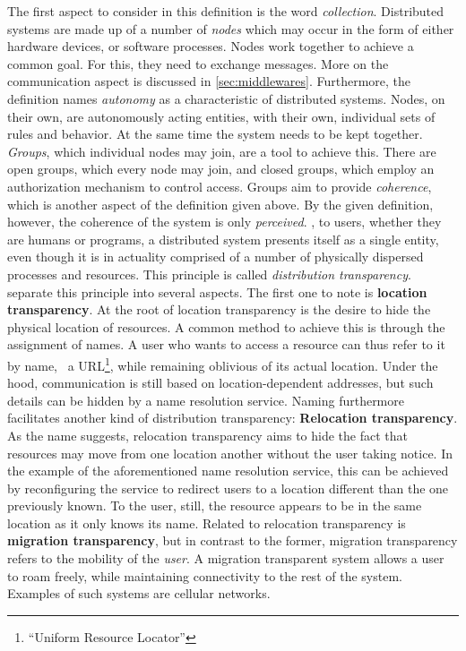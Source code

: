 The first aspect to consider in this definition is the word \emph{collection}. Distributed systems are made up of a number of \emph{nodes} which may occur in the form of either hardware devices, or software processes. Nodes work together to achieve a common goal. For this, they need to exchange messages. More on the communication aspect is discussed in \autoref{sec:middlewares}. Furthermore, the definition names \emph{autonomy} as a characteristic of distributed systems. Nodes, on their own, are autonomously acting entities, with their own, individual sets of rules and behavior. At the same time the system needs to be kept together. \emph{Groups}, which individual nodes may join, are a tool to achieve this. There are open groups, which every node may join, and closed groups, which employ an authorization mechanism to control access. 
Groups aim to provide \emph{coherence}, which is another aspect of the definition given above. By the given definition, however, the coherence of the system is only \emph{perceived}. \Ie , to users, whether they are humans or programs, a distributed system presents itself as a single entity, even though it is in actuality comprised of a number of physically dispersed processes and resources. This principle is called \emph{distribution transparency}. \citeauthor*{tanenbaum2017distributed} \cite{tanenbaum2017distributed} separate this principle into several aspects. The first one to note is \textbf{location transparency}. At the root of location transparency is the desire to hide the physical location of resources. A common method to achieve this is through the assignment of names. A user who wants to access a resource can thus refer to it by name, \eg\ a URL\footnote{``Uniform Resource Locator''}, while remaining oblivious of its actual location. Under the hood, communication is still based on location-dependent addresses, but such details can be hidden by a name resolution service. 
Naming furthermore facilitates another kind of distribution transparency: \textbf{Relocation transparency}. As the name suggests, relocation transparency aims to hide the fact that resources may move from one location another without the user taking notice. In the example of the aforementioned name resolution service, this can be achieved by reconfiguring the service to redirect users to a location different than the one previously known. To the user, still, the resource appears to be in the same location as it only knows its name. 
Related to relocation transparency is \textbf{migration transparency}, but in contrast to the former, migration transparency refers to the mobility of the \emph{user}. A migration transparent system allows a user to roam freely, while maintaining connectivity to the rest of the system. Examples of such systems are cellular networks.

